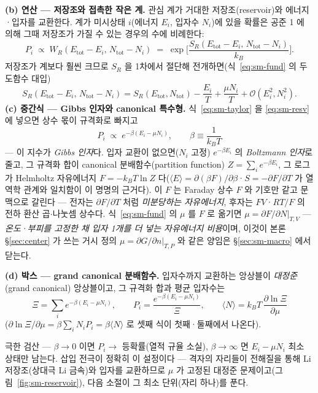 \textbf{(b) 연산 --- 저장조와 접촉한 작은 계.} 관심 계가 거대한 저장조(reservoir)와 에너지·입자를 교환한다.
계가 미시상태 $i$(에너지 $E_i$, 입자수 $N_i$)에 있을 확률은 공준 1 에 의해 그때 저장조가 가질 수 있는 경우의
수에 비례한다:
\begin{equation}
P_i\;\propto\;W_R(E_\mathrm{tot}-E_i,\,N_\mathrm{tot}-N_i)
\;=\;\exp\!\Big[\frac{S_R(E_\mathrm{tot}-E_i,\,N_\mathrm{tot}-N_i)}{k_B}\Big].
\label{eq:sm-resv}
\end{equation}
저장조가 계보다 훨씬 크므로 $S_R$ 을 1차에서 절단해 전개하면(식~\eqref{eq:sm-fund} 의 두 도함수 대입)
\begin{equation}
S_R(E_\mathrm{tot}-E_i,\,N_\mathrm{tot}-N_i)
= S_R(E_\mathrm{tot},N_\mathrm{tot})-\frac{E_i}{T}+\frac{\mu N_i}{T}+\mathcal O(E_i^2,N_i^2).
\label{eq:sm-taylor}
\end{equation}
\textbf{(c) 중간식 --- Gibbs 인자와 canonical 특수형.} 식~\eqref{eq:sm-taylor} 을 \eqref{eq:sm-resv} 에 넣으면
상수 몫이 규격화로 빠지고
\begin{equation}
P_i\;\propto\;e^{-\beta(E_i-\mu N_i)},\qquad \beta\equiv\frac{1}{k_BT}
\label{eq:sm-gibbsfactor}
\end{equation}
--- 이 지수가 \emph{Gibbs 인자}다. 입자 교환이 없으면($N_i$ 고정) $e^{-\beta E_i}$ 의 \emph{Boltzmann 인자}로
줄고, 그 규격화 합이 canonical 분배함수(partition function) $Z=\sum_ie^{-\beta E_i}$, 그 로그가 Helmholtz
자유에너지 $F=-k_BT\ln Z$ 다($\langle E\rangle=\partial(\beta F)/\partial\beta$·$S=-\partial F/\partial T$ 가
열역학 관계와 일치함이 이 명명의 근거다). 이 $F$ 는 Faraday 상수 $F$ 와 기호만 같고 문맥으로 갈린다 ---
전자는 $\partial F/\partial T$ 처럼 \emph{미분당하는 자유에너지}, 후자는 $FV$·$RT/F$ 의 전하 환산
곱$\cdot$나눗셈 상수다. 식~\eqref{eq:sm-fund} 의 $\mu$ 를 $F$ 로 옮기면
$\mu=\partial F/\partial N|_{T,V}$ --- \emph{온도·부피를 고정한 채 입자 1개를 더 넣는 자유에너지 비용}이며,
이것이 본론 \S\ref{sec:center} 가 쓰는 거시 정의 $\mu=\partial G/\partial n|_{T,P}$ 와 같은 양임은
\S\ref{sec:sm-macro} 에서 닫는다.

\textbf{(d) 박스 --- grand canonical 분배함수.} 입자수까지 교환하는 앙상블이
\emph{대정준}(grand canonical) 앙상블이고, 그 규격화 합과 평균 입자수는
\begin{equation}
\boxed{\;\Xi=\sum_i e^{-\beta(E_i-\mu N_i)},\qquad
P_i=\frac{e^{-\beta(E_i-\mu N_i)}}{\Xi},\qquad
\langle N\rangle=k_BT\,\frac{\partial\ln\Xi}{\partial\mu}\;}
\label{eq:sm-gc}
\end{equation}
($\partial\ln\Xi/\partial\mu=\beta\sum_iN_iP_i=\beta\langle N\rangle$ 로 셋째 식이 첫째·둘째에서 나온다).
\begin{verifybox}
극한 검산 --- $\beta\to0$ 이면 $P_i\to$ 등확률(열적 규율 소실), $\beta\to\infty$ 면 $E_i-\mu N_i$ 최소 상태만
남는다. 삽입 전극이 정확히 이 설정이다 --- 격자의 자리들이 전해질을 통해 Li 저장조(상대극 Li 금속)와 입자를
교환하므로 $\mu$ 가 고정된 대정준 문제이고(그림~\ref{fig:sm-reservoir}), 다음 소절이 그 최소 단위(자리
하나)를 푼다.
\end{verifybox}

